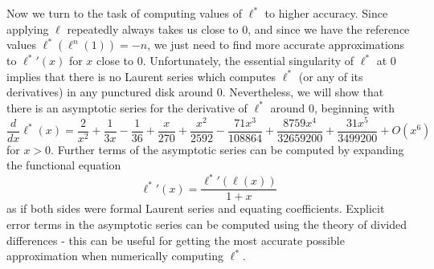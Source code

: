 \documentclass[letterpaper,11pt]{article}
\begin{document}
Now we turn to the task of computing values of $\ell^*$ to higher accuracy. Since applying $\ell$ repeatedly always takes us close to $0$, and since we have the reference values $\ell^*(\ell^n(1)) = -n$, we just need to find more accurate approximations to ${\ell^*}'(x)$ for $x$ close to $0$. Unfortunately, the essential singularity of $\ell^*$ at $0$ implies that there is no Laurent series which computes $\ell^*$ (or any of its derivatives) in any punctured disk around $0$. Nevertheless, we will show that there is an asymptotic series for the derivative of $\ell^*$ around $0$, beginning with
\[
\frac{d}{dx}\ell^*(x) = \frac{2}{x^2} + \frac{1}{3x} - \frac{1}{36} + \frac{x}{270} + \frac{x^2}{2592} - \frac{71x^3}{108864} + \frac{8759x^4}{32659200} + \frac{31x^5}{3499200} + O(x^6)
\]
for $x > 0$. Further terms of the asymptotic series can be computed by expanding the functional equation
\[
{\ell^*}'(x) = \frac{{\ell^*}'(\ell(x))}{1+x}
\]
as if both sides were formal Laurent series and equating coefficients. Explicit error terms in the asymptotic series can be computed using the theory of divided differences - this can be useful for getting the most accurate possible approximation when numerically computing $\ell^*$.
\end{document}
